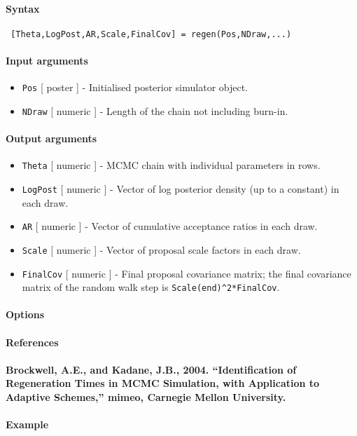 


	\paragraph{Syntax}
 
 \begin{verbatim}
 [Theta,LogPost,AR,Scale,FinalCov] = regen(Pos,NDraw,...)
 \end{verbatim}
 
 \paragraph{Input arguments}
 
 \begin{itemize}
 \item
   \texttt{Pos} {[} poster {]} - Initialised posterior simulator object.
 \item
   \texttt{NDraw} {[} numeric {]} - Length of the chain not including
   burn-in.
 \end{itemize}
 
 \paragraph{Output arguments}
 
 \begin{itemize}
 \item
   \texttt{Theta} {[} numeric {]} - MCMC chain with individual parameters
   in rows.
 \item
   \texttt{LogPost} {[} numeric {]} - Vector of log posterior density (up
   to a constant) in each draw.
 \item
   \texttt{AR} {[} numeric {]} - Vector of cumulative acceptance ratios
   in each draw.
 \item
   \texttt{Scale} {[} numeric {]} - Vector of proposal scale factors in
   each draw.
 \item
   \texttt{FinalCov} {[} numeric {]} - Final proposal covariance matrix;
   the final covariance matrix of the random walk step is
   \texttt{Scale(end)\^{}2*FinalCov}.
 \end{itemize}
 
 \paragraph{Options}
 
 \paragraph{References}
 
 \paragraph{Brockwell, A.E., and Kadane, J.B., 2004. ``Identification of
 Regeneration Times in MCMC Simulation, with Application to Adaptive
 Schemes,'' mimeo, Carnegie Mellon University.}
 
 \paragraph{Example}


